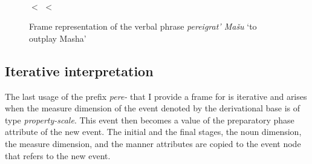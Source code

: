 \begin{figure}
\begin{minipage}{0.55\textwidth}
\end{minipage}\hfill%
\begin{minipage}{0.4\textwidth}\centering
{}\\
 $<$  $<$ 
\end{minipage}
\caption{Frame representation of the verbal phrase \textit{pereigrat' Ma\v{s}u} `to outplay Masha' \label{frame:outplay:Masha}}
\end{figure}

\subsection{Iterative interpretation}
The last usage of the prefix \textit{pere-} that I provide a frame for is iterative and arises when the measure dimension of the event denoted by the derivational base is of type \textit{property-scale}. This event then becomes a value of the preparatory phase attribute of the new event. The initial and the final stages, the noun dimension, the measure dimension, and the manner attributes are copied to the event node that refers to the new event. 

